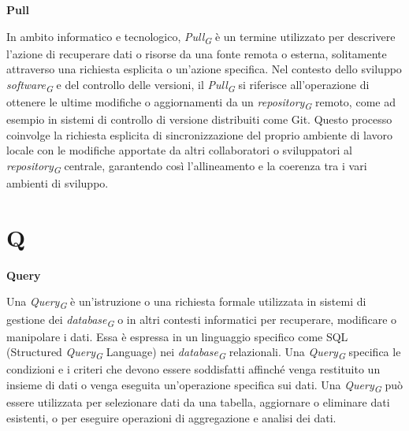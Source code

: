 \documentclass{article}
\begin{document}
\vspace{0.4cm}

\textbf{Pull}

\vspace{0.1cm}

In ambito informatico e tecnologico, \textit{Pull}\textsubscript{\textit{G}} è un termine utilizzato per descrivere l'azione di recuperare dati o risorse da una fonte remota o esterna, solitamente attraverso una richiesta esplicita o un'azione specifica. Nel contesto dello sviluppo \textit{software}\textsubscript{\textit{G}} e del controllo delle versioni, il \textit{Pull}\textsubscript{\textit{G}} si riferisce all'operazione di ottenere le ultime modifiche o aggiornamenti da un \textit{repository}\textsubscript{\textit{G}} remoto, come ad esempio in sistemi di controllo di versione distribuiti come Git. Questo processo coinvolge la richiesta esplicita di sincronizzazione del proprio ambiente di lavoro locale con le modifiche apportate da altri collaboratori o sviluppatori al \textit{repository}\textsubscript{\textit{G}} centrale, garantendo così l'allineamento e la coerenza tra i vari ambienti di sviluppo.

\vspace{0.4cm}

\pagebreak
\section*{Q}
{}

\vspace{0.4cm}

\textbf{Query}

\vspace{0.1cm}

Una \textit{Query}\textsubscript{\textit{G}} è un'istruzione o una richiesta formale utilizzata in sistemi di gestione dei \textit{database}\textsubscript{\textit{G}} o in altri contesti informatici per recuperare, modificare o manipolare i dati. Essa è espressa in un linguaggio specifico come SQL (Structured \textit{Query}\textsubscript{\textit{G}} Language) nei \textit{database}\textsubscript{\textit{G}} relazionali. Una \textit{Query}\textsubscript{\textit{G}} specifica le condizioni e i criteri che devono essere soddisfatti affinché venga restituito un insieme di dati o venga eseguita un'operazione specifica sui dati. Una \textit{Query}\textsubscript{\textit{G}} può essere utilizzata per selezionare dati da una tabella, aggiornare o eliminare dati esistenti, o per eseguire operazioni di aggregazione e analisi dei dati.
\end{document}
